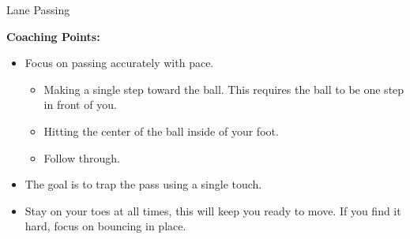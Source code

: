 \begin{oddBlock}{Lane Passing}
\begin{minipage}[t]{\linewidth}
\begin{minipage}{.6\linewidth}
        \textbf{Coaching Points:}
        \begin{itemize}
        \setlength{\itemsep}{0pt}
        \setlength{\parskip}{0pt}
        \setlength{\parsep}{0pt}
        \item Focus on passing accurately with pace.
        \begin{itemize}
            \setlength{\itemsep}{0pt}
            \setlength{\parskip}{0pt}
            \setlength{\parsep}{0pt}
            \item Making a single step toward the ball.  This requires the ball to be one step in front of you.
            \item Hitting the center of the ball inside of your foot.
            \item Follow through.
        \end{itemize} 
        \item The goal is to trap the pass using a single touch.
        \item Stay on your toes at all times, this will keep you ready to move.  If you find it hard, focus on bouncing in place.
        \end{itemize}

    \end{minipage}
\end{minipage}

\end{oddBlock}